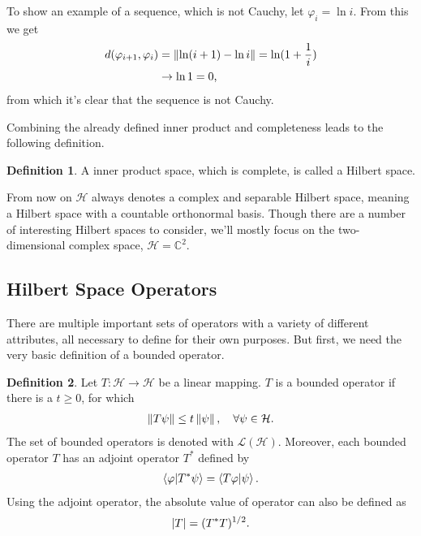 \documentclass[a4paper,12pt]{wihuri}
\theoremstyle{definition}
\newtheorem{definition}{Definition}
\numberwithin{definition}{section}
\numberwithin{example}{section}
\numberwithin{theorem}{section}
\numberwithin{proposition}{section}
\numberwithin{lemma}{section}
\newcommand{\hi}{\mathcal{H}}%
\newcommand{\salg}{\mathcal{F}}%
\newcommand{\lin}{\mathcal{L}}%
\newcommand{\cc}{\mathbb{C}^2}%
\newcommand{\norm}[1]{\left\lVert#1\right\rVert}
\begin{document}
To show an example of a sequence, which is not Cauchy, let $\varphi_i = \ln i$. From this we get
\begin{align*}
d(\varphi_{i+1}, \varphi_{i}) &= \norm{\ln(i+1) - \ln i} = \ln(1+\dfrac{1}{i}) \\
&\rightarrow \ln 1 = 0\text,
\end{align*}
from which it's clear that the sequence is not Cauchy.

Combining the already defined inner product and completeness leads to the following definition.
\begin{definition}
A inner product space, which is complete, is called a Hilbert space.
\end{definition}


From now on $\hi$ always denotes a complex and separable Hilbert space, meaning a Hilbert space with a countable orthonormal basis. 
Though there are a number of interesting Hilbert spaces to consider, we'll mostly focus on the two-dimensional complex space, $\hi = \cc$.

\subsection{Hilbert Space Operators}
There are multiple important sets of operators with a variety of different attributes, all necessary to define for their own purposes. But first, we need the very basic definition of a bounded operator. 


\begin{definition}
Let $T:\hi \rightarrow\hi$ be a linear mapping. $T$ is a bounded operator if there is a $t \geq 0$, for which
\begin{align*}
\norm{T\psi} \leq t\norm{\psi}, \quad \forall \psi \in \hi \text.
\end{align*} 
The set of bounded operators is denoted with $\lin(\hi)$. Moreover, each bounded operator $T$ has an adjoint operator $T^*$ defined by 
\begin{align*}
\braket{\varphi|T^* \psi} = \braket{T\varphi|\psi}.
\end{align*}
Using the adjoint operator, the absolute value of operator can also be defined as
\begin{align*}
|T| = (T^*T)^{1/2}\text.
\end{align*} 
\end{definition}
\end{document}
